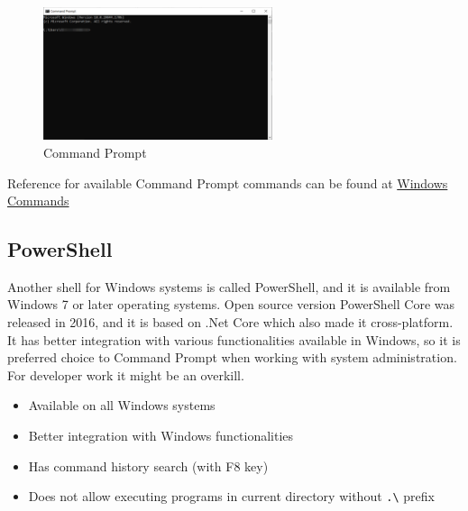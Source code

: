 \begin{figure}[htbp]
    \centering
    \includegraphics[width=0.6\textwidth]{images/command-prompt}
    \caption{Command Prompt\label{fig:Command Prompt}}
\end{figure}

Reference for available Command Prompt commands can be found at
\href{https://docs.microsoft.com/en-us/windows-server/administration/windows-commands/windows-commands}{Windows Commands}

\subsection{PowerShell}\label{subsec:powershell}
Another shell for Windows systems is called PowerShell, and it is available from Windows 7 or later operating systems.
Open source version PowerShell Core was released in 2016, and it is based on .Net Core which also made it cross-platform.
It has better integration with various functionalities available in Windows, so it is preferred choice to Command Prompt
when working with system administration.
For developer work it might be an overkill.


\noindent\begin{minipage}[t]{0.5\textwidth}%
    \begin{itemize}[leftmargin=*]
        \item Available on all Windows systems
        \item Better integration with Windows functionalities
        \item Has command history search (with F8 key)
    \end{itemize}
\end{minipage}%
\begin{minipage}[t]{0.5\textwidth}%
    \begin{itemize}[leftmargin=*]
        \item  Does not allow executing programs in
              current directory without  \lstinline{.\} prefix
    \end{itemize}
\end{minipage}%

